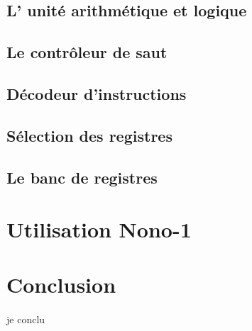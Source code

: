 \documentclass[a4paper]{article}
\begin{document}
		\subsection{L' unité arithmétique et logique}
			
			
		\subsection{Le contrôleur de saut}
			
			
		\subsection{Décodeur d'instructions}
			
			
		\subsection{Sélection des registres}
			
			
		\subsection{Le banc de registres}
			
		
	\section{Utilisation Nono-1}

	
	
	\newpage
	\section*{Conclusion}
		\paragraph{}{je conclu}
		
\end{document}

